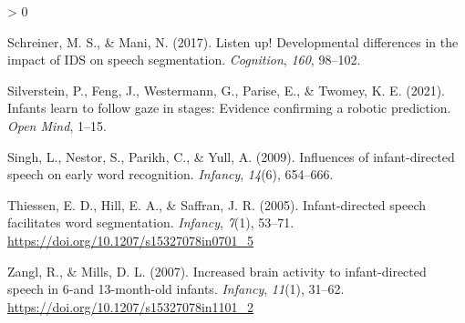 \documentclass[
  english,
  man,floatsintext]{apa6}
\newlength{\cslhangindent}
\newenvironment{CSLReferences}[2] %
 {%
  \setlength{\parindent}{0pt}
  \ifodd #1 \everypar{\setlength{\hangindent}{\cslhangindent}}\ignorespaces\fi
  \ifnum #2 > 0
  \setlength{\parskip}{#2\baselineskip}
  \fi
 }%
 {}
\begin{document}
\begin{CSLReferences}{1}{0}
\leavevmode\hypertarget{ref-schreiner2017listen}{}%
Schreiner, M. S., \& Mani, N. (2017). Listen up! Developmental differences in the impact of IDS on speech segmentation. \emph{Cognition}, \emph{160}, 98--102.

\leavevmode\hypertarget{ref-silverstein2021infants}{}%
Silverstein, P., Feng, J., Westermann, G., Parise, E., \& Twomey, K. E. (2021). Infants learn to follow gaze in stages: Evidence confirming a robotic prediction. \emph{Open Mind}, 1--15.

\leavevmode\hypertarget{ref-singh2009influences}{}%
Singh, L., Nestor, S., Parikh, C., \& Yull, A. (2009). Influences of infant-directed speech on early word recognition. \emph{Infancy}, \emph{14}(6), 654--666.

\leavevmode\hypertarget{ref-thiessen2005infant}{}%
Thiessen, E. D., Hill, E. A., \& Saffran, J. R. (2005). Infant-directed speech facilitates word segmentation. \emph{Infancy}, \emph{7}(1), 53--71. \url{https://doi.org/10.1207/s15327078in0701_5}

\leavevmode\hypertarget{ref-zangl2007increased}{}%
Zangl, R., \& Mills, D. L. (2007). Increased brain activity to infant-directed speech in 6-and 13-month-old infants. \emph{Infancy}, \emph{11}(1), 31--62. \url{https://doi.org/10.1207/s15327078in1101_2}

\end{CSLReferences}

\endgroup
\end{document}
